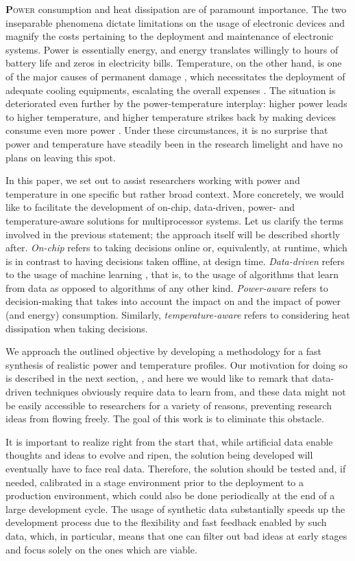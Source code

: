 \lettrine[findent=0.4em, nindent=0em]{\textbf{P}}{ower} consumption and heat
dissipation are of paramount importance. The two inseparable phenomena dictate
limitations on the usage of electronic devices and magnify the costs pertaining
to the deployment and maintenance of electronic systems. Power is essentially
energy, and energy translates willingly to hours of battery life and zeros in
electricity bills. Temperature, on the other hand, is one of the major causes of
permanent damage \cite{jedec}, which necessitates the deployment of adequate
cooling equipments, escalating the overall expenses \cite{chaudhry2015}. The
situation is deteriorated even further by the power-temperature interplay:
higher power leads to higher temperature, and higher temperature strikes back by
making devices consume even more power \cite{liu2007}. Under these
circumstances, it is no surprise that power and temperature have steadily been
in the research limelight and have no plans on leaving this spot.

In this paper, we set out to assist researchers working with power and
temperature in one specific but rather broad context. More concretely, we would
like to facilitate the development of on-chip, data-driven, power- and
temperature-aware solutions for multiprocessor systems. Let us clarify the terms
involved in the previous statement; the approach itself will be described
shortly after. \emph{On-chip} refers to taking decisions online or,
equivalently, at runtime, which is in contrast to having decisions taken
offline, at design time. \emph{Data-driven} refers to the usage of machine
learning \cite{bishop2006}, that is, to the usage of algorithms that learn from
data as opposed to algorithms of any other kind. \emph{Power-aware} refers to
decision-making that takes into account the impact on and the impact of power
(and energy) consumption. Similarly, \emph{temperature-aware} refers to
considering heat dissipation when taking decisions.

We approach the outlined objective by developing a methodology for a fast
synthesis of realistic power and temperature profiles. Our motivation for doing
so is described in the next section, , and here we would like
to remark that data-driven techniques obviously require data to learn from, and
these data might not be easily accessible to researchers for a variety of
reasons, preventing research ideas from flowing freely. The goal of this work is
to eliminate this obstacle.

It is important to realize right from the start that, while artificial data
enable thoughts and ideas to evolve and ripen, the solution being developed will
eventually have to face real data. Therefore, the solution should be tested and,
if needed, calibrated in a stage environment prior to the deployment to a
production environment, which could also be done periodically at the end of a
large development cycle. The usage of synthetic data substantially speeds up the
development process due to the flexibility and fast feedback enabled by such
data, which, in particular, means that one can filter out bad ideas at early
stages and focus solely on the ones which are viable.

